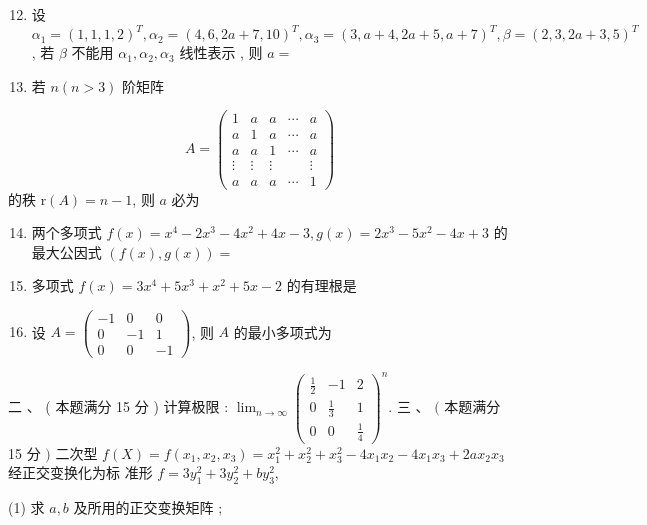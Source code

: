 \documentclass[10pt]{article}
\begin{document}
{\begin{enumerate}
  \setcounter{enumi}{11}
  \item  设  $\alpha_{1}=(1,1,1,2)^{T}, \alpha_{2}=(4,6,2 a+7,10)^{T}, \alpha_{3}=(3, a+4,2 a+5, a+7)^{T}, \beta=(2,3,2 a+3,5)^{T}$,  若  $\beta$  不能用  $\alpha_{1}, \alpha_{2}, \alpha_{3}$  线性表示 ,  则  $a=$

  \item  若  $n(n>3)$  阶矩阵 

\end{enumerate}
$$
A=\left(\begin{array}{ccccc}
1 & a & a & \cdots & a \\
a & 1 & a & \cdots & a \\
a & a & 1 & \cdots & a \\
\vdots & \vdots & \vdots & & \vdots \\
a & a & a & \cdots & 1
\end{array}\right)
$$
 的秩  $\mathrm{r}(A)=n-1$,  则  $a$  必为 

\begin{enumerate}
  \setcounter{enumi}{13}
  \item  两个多项式  $f(x)=x^{4}-2 x^{3}-4 x^{2}+4 x-3, g(x)=2 x^{3}-5 x^{2}-4 x+3$  的最大公因式  $(f(x), g(x))=$

  \item  多项式  $f(x)=3 x^{4}+5 x^{3}+x^{2}+5 x-2$  的有理根是 

  \item  设  $A=\left(\begin{array}{ccc}-1 & 0 & 0 \\ 0 & -1 & 1 \\ 0 & 0 & -1\end{array}\right)$,  则  $A$  的最小多项式为 

\end{enumerate}
 二 、 ( 本题满分  15  分 )  计算极限 : $\lim _{n \rightarrow \infty}\left(\begin{array}{ccc}\frac{1}{2} & -1 & 2 \\ 0 & \frac{1}{3} & 1 \\ 0 & 0 & \frac{1}{4}\end{array}\right)^{n}$.  三 、 $($  本题满分  15  分  $)$  二次型  $f(X)=f\left(x_{1}, x_{2}, x_{3}\right)=x_{1}^{2}+x_{2}^{2}+x_{3}^{2}-4 x_{1} x_{2}-4 x_{1} x_{3}+2 a x_{2} x_{3}$  经正交变换化为标   准形  $f=3 y_{1}^{2}+3 y_{2}^{2}+b y_{3}^{2}$,

(1)  求  $a, b$  及所用的正交变换矩阵 ;

}
\end{document}
